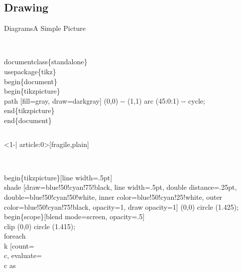 \subsection{Drawing}

{\tikzset{external/export=false}%
	\tikzexternaldisable
\begin{frame}[fragile]{Diagrams}{A Simple \Tikz{} Picture}
  \begin{columns}
    \begin{column}{.75\linewidth}
\begin{semiverbatim}
\\documentclass\{standalone\}
\alert<1>{\\usepackage\{tikz\}}
\\begin\{document\}
\alert<2>{\\begin\{tikzpicture\}}
\alert<3>{\\path [fill=gray, draw=darkgray] 
  (0,0) -{}- (1,1) arc (45:0:1) -{}- cycle;}
\alert<2>{\\end\{tikzpicture\}}
\\end\{document\}
\end{semiverbatim}
    \end{column}%
    \begin{column}{.25\linewidth}
    \end{column}
  \end{columns}
\end{frame}
\begin{frame}<1-| article:0>[fragile,plain]%
   \begin{columns}
    \begin{column}{.75\linewidth}
\begin{semiverbatim}
\\begin\{tikzpicture\}[line width=.5pt]
  \\shade [draw=blue!50!cyan!75!black, line width=.5pt, 
  double distance=.25pt, double=blue!50!cyan!50!white, 
  inner color=blue!50!cyan!25!white, outer 
  color=blue!50!cyan!75!black, opacity=1, draw opacity=1] 
  (0,0) circle (1.425);
  \\begin\{scope\}[blend mode=screen, opacity=.5]
    \\clip (0,0) circle (1.415);
    \alert{\\foreach \\k} [count=\\c, evaluate=\\c as 

\end{semiverbatim}
\end{column}
\end{columns}
\end{frame}}
